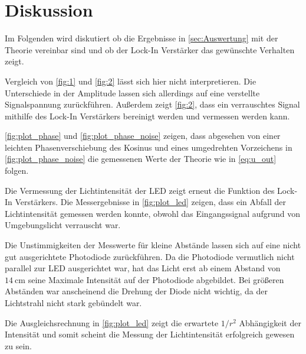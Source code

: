 \section{Diskussion}
\label{sec:Diskussion}


Im Folgenden wird diskutiert ob die Ergebnisse in \autoref{sec:Auswertung} mit der Theorie vereinbar sind und ob der Lock-In Verstärker das gewünschte Verhalten zeigt.

Vergleich von \autoref{fig:1} und \autoref{fig:2} lässt sich hier nicht interpretieren.
Die Unterschiede in der Amplitude lassen sich allerdings auf eine verstellte Signalspannung zurückführen.
Außerdem zeigt \autoref{fig:2}, dass ein verrauschtes Signal mithilfe des Lock-In Verstärkers bereinigt werden und vermessen werden kann.

\autoref{fig:plot_phase} und \autoref{fig:plot_phase_noise} zeigen, dass abgesehen von einer leichten Phasenverschiebung des Kosinus und eines umgedrehten Vorzeichens in \autoref{fig:plot_phase_noise} die gemessenen Werte der Theorie wie in \autoref{eq:u_out} folgen.

Die Vermessung der Lichtintensität der LED zeigt erneut die Funktion des Lock-In Verstärkers.
Die Messergebnisse in \autoref{fig:plot_led} zeigen, dass ein Abfall der Lichtintensität gemessen werden konnte, obwohl das Eingangssignal aufgrund von Umgebungslicht verrauscht war.

Die Unstimmigkeiten der Messwerte für kleine Abstände lassen sich auf eine nicht gut ausgerichtete Photodiode zurückführen.
Da die Photodiode vermutlich nicht parallel zur LED ausgerichtet war, hat das Licht erst ab einem Abstand von $\SI{14}{\centi\meter}$ seine Maximale Intensität auf der Photodiode abgebildet. 
Bei größeren Abständen war anscheinend die Drehung der Diode nicht wichtig, da der Lichtstrahl nicht stark gebündelt war. 

Die Ausgleichsrechnung in \autoref{fig:plot_led} zeigt die erwartete $1/r^2$ Abhängigkeit der Intensität und somit scheint die Messung der Lichtintensität erfolgreich gewesen zu sein.